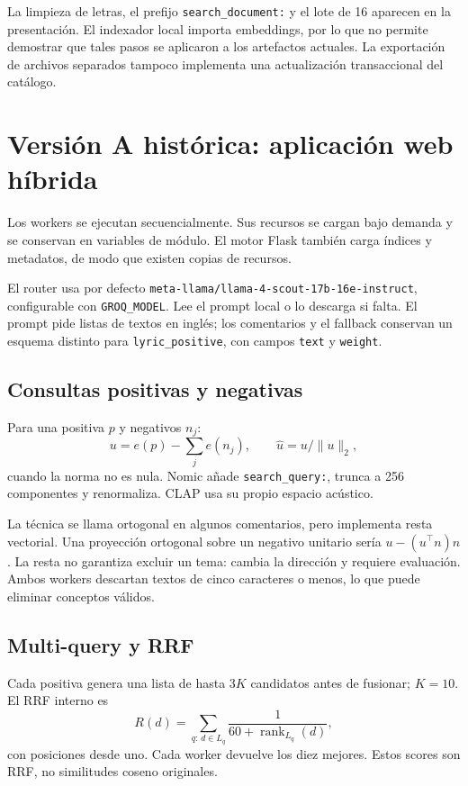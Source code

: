 \documentclass[11pt,a4paper]{article}
\newcommand{\code}[1]{\nolinkurl{#1}}
\begin{document}
La limpieza de letras, el prefijo \code{search_document:} y el lote de 16 aparecen en la presentación. El indexador local importa embeddings, por lo que no permite demostrar que tales pasos se aplicaron a los artefactos actuales. La exportación de archivos separados tampoco implementa una actualización transaccional del catálogo.

\section{Versión A histórica: aplicación web híbrida}
\begin{center}
\end{center}
Los workers se ejecutan secuencialmente. Sus recursos se cargan bajo demanda y se conservan en variables de módulo. El motor Flask también carga índices y metadatos, de modo que existen copias de recursos.

El router usa por defecto \code{meta-llama/llama-4-scout-17b-16e-instruct}, configurable con \code{GROQ_MODEL}. Lee el prompt local o lo descarga si falta. El prompt pide listas de textos en inglés; los comentarios y el fallback conservan un esquema distinto para \code{lyric_positive}, con campos \code{text} y \code{weight}.

\subsection{Consultas positivas y negativas}
Para una positiva $p$ y negativos $n_j$:
\[
u=e(p)-\sum_j e(n_j),\qquad \widehat{u}=u/\|u\|_2,
\]
cuando la norma no es nula. Nomic añade \code{search_query:}, trunca a 256 componentes y renormaliza. CLAP usa su propio espacio acústico.

La técnica se llama ortogonal en algunos comentarios, pero implementa resta vectorial. Una proyección ortogonal sobre un negativo unitario sería $u-(u^\top n)n$. La resta no garantiza excluir un tema: cambia la dirección y requiere evaluación. Ambos workers descartan textos de cinco caracteres o menos, lo que puede eliminar conceptos válidos.

\subsection{Multi-query y RRF}
Cada positiva genera una lista de hasta $3K$ candidatos antes de fusionar; $K=10$. El RRF interno es
\[
R(d)=\sum_{q:\,d\in L_q}\frac{1}{60+\operatorname{rank}_{L_q}(d)},
\]
con posiciones desde uno. Cada worker devuelve los diez mejores. Estos scores son RRF, no similitudes coseno originales.
\end{document}
